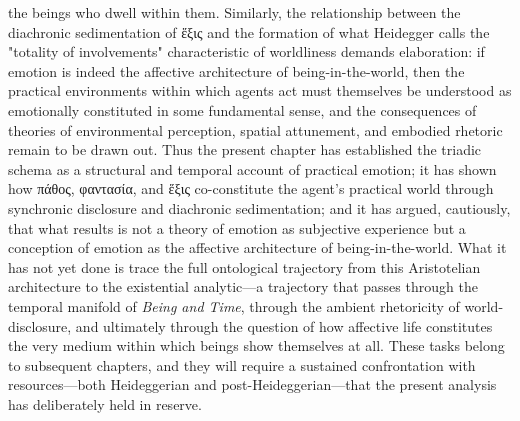 \documentclass{article}
\begin{document}
the beings who dwell within them. Similarly, the relationship between the diachronic sedimentation of ἕξις and the formation of what Heidegger calls the "totality of involvements" characteristic of worldliness demands elaboration: if emotion is indeed the affective architecture of being-in-the-world, then the practical environments within which agents act must themselves be understood as emotionally constituted in some fundamental sense, and the consequences of theories of environmental perception, spatial attunement, and embodied rhetoric remain to be drawn out. Thus the present chapter has established the triadic schema as a structural and temporal account of practical emotion; it has shown how πάθος, φαντασία, and ἕξις co-constitute the agent's practical world through synchronic disclosure and diachronic sedimentation; and it has argued, cautiously, that what results is not a theory of emotion as subjective experience but a conception of emotion as the affective architecture of being-in-the-world. What it has not yet done is trace the full ontological trajectory from this Aristotelian architecture to the existential analytic—a trajectory that passes through the temporal manifold of \textit{Being and Time}, through the ambient rhetoricity of world-disclosure, and ultimately through the question of how affective life constitutes the very medium within which beings show themselves at all. These tasks belong to subsequent chapters, and they will require a sustained confrontation with resources—both Heideggerian and post-Heideggerian—that the present analysis has deliberately held in reserve.
\end{document}
